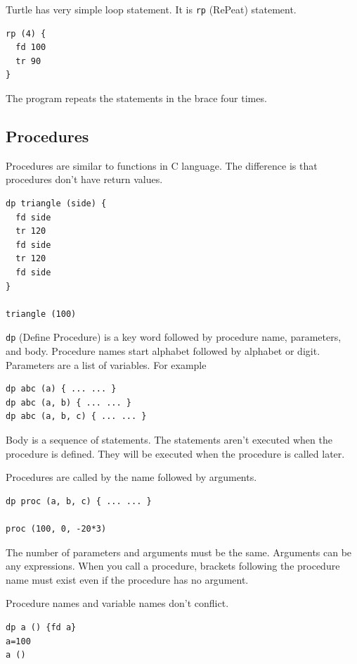 Turtle has very simple loop statement. It is
\passthrough{\lstinline!rp!} (RePeat) statement.

\begin{lstlisting}
rp (4) {
  fd 100
  tr 90
}
\end{lstlisting}

The program repeats the statements in the brace four times.

\subsection{Procedures}\label{procedures}

Procedures are similar to functions in C language. The difference is
that procedures don't have return values.

\begin{lstlisting}
dp triangle (side) {
  fd side
  tr 120
  fd side
  tr 120
  fd side
}

triangle (100)
\end{lstlisting}

\passthrough{\lstinline!dp!} (Define Procedure) is a key word followed
by procedure name, parameters, and body. Procedure names start alphabet
followed by alphabet or digit. Parameters are a list of variables. For
example

\begin{lstlisting}
dp abc (a) { ... ... }
dp abc (a, b) { ... ... }
dp abc (a, b, c) { ... ... }
\end{lstlisting}

Body is a sequence of statements. The statements aren't executed when
the procedure is defined. They will be executed when the procedure is
called later.

Procedures are called by the name followed by arguments.

\begin{lstlisting}
dp proc (a, b, c) { ... ... }

proc (100, 0, -20*3)
\end{lstlisting}

The number of parameters and arguments must be the same. Arguments can
be any expressions. When you call a procedure, brackets following the
procedure name must exist even if the procedure has no argument.

Procedure names and variable names don't conflict.

\begin{lstlisting}
dp a () {fd a}
a=100
a ()
\end{lstlisting}

